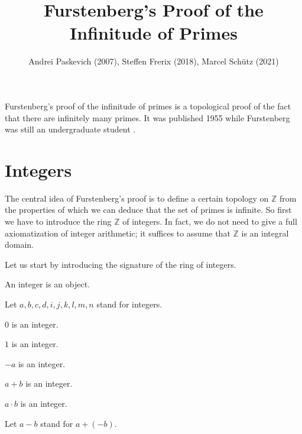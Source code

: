 \documentclass{article}
\title{Furstenberg's Proof of the Infinitude of Primes}
\author{Andrei Paskevich (2007), Steffen Frerix (2018), Marcel Schütz (2021)}
\date{}
\newcommand{\Int}{\mathbb{Z}}
\begin{document}
  \maketitle

  Furstenberg's proof of the infinitude of primes is a topological proof of the fact that there are
  infinitely many primes. It was published 1955 while Furstenberg was still an undergraduate
  student \cite{Furstenberg1955}.

  \section{Integers}

  The central idea of Furstenberg's proof is to define a certain topology on $\Int$ from the
  properties of which we can deduce that the set of primes is infinite. So first we have to
  introduce the ring $\Int$ of integers. In fact, we do not need to give a full axiomatization of
  integer arithmetic; it suffices to assume that $\Int$ is an integral domain.

  Let us start by introducing the signature of the ring of integers.

  \begin{forthel}

    \begin{signature}\label{Integers}
      An integer is an object.
    \end{signature}

    Let $a,b,c,d,i,j,k,l,m,n$ stand for integers.

    \begin{signature}\label{IntZero}
      $0$ is an integer.
    \end{signature}

    \begin{signature}\label{IntOne}
      $1$ is an integer.
    \end{signature}

    \begin{signature}\label{IntNeg}
      $-a$ is an integer.
    \end{signature}

    \begin{signature}\label{IntPlus}
      $a + b$ is an integer.
    \end{signature}

    \begin{signature}\label{IntMult}
      $a \cdot b$ is an integer.
    \end{signature}

    Let $a - b$ stand for $a + (-b)$.
  \end{forthel}
\end{document}
